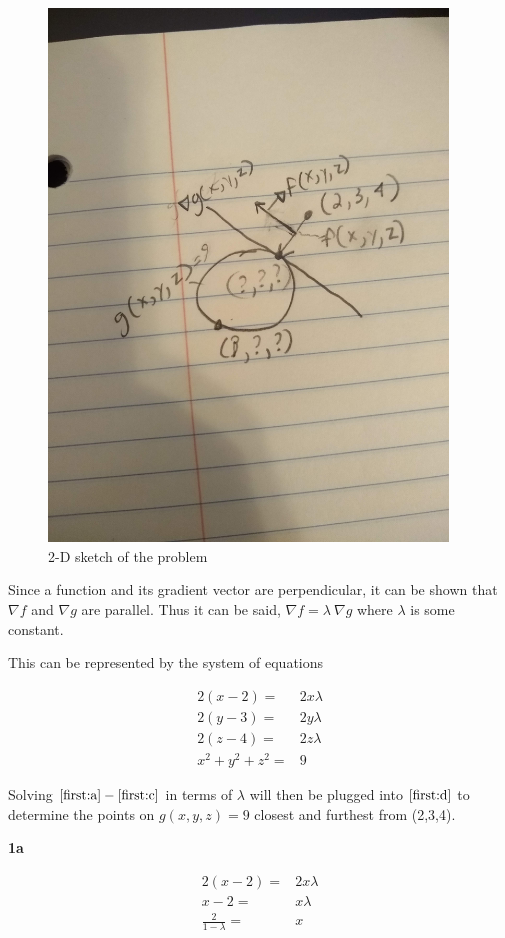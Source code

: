 \documentclass[11pt]{article}
\begin{document}
\begin{figure}[htbp]
\centering
\includegraphics[width=10.6cm,height=7cm\textwidth]{./resources/homework2.jpg}
\caption{\label{fig:org96ae625}2-D sketch of the problem}
\end{figure}


Since a function and its gradient vector are perpendicular, it can be shown that
\(\nabla f\) and \(\nabla g\) are parallel. Thus it can be said, \(\nabla f = \lambda
\ \nabla g\) where \(\lambda\) is some constant.

This can be represented by the system of equations

\begin{subequations}
\label{first:main}
\begin{align}
2(x - 2) = & 2x \lambda \label{first:a}\\
2(y - 3) = & 2y \lambda \label{first:b} \\
2(z - 4) = & 2z \lambda \label{first:c} \\
x^2 + y^2 + z^2 = & 9 \label{first:d}
\end{align}
\end{subequations}

Solving \(\eqref{first:a} - \eqref{first:c}\) in terms of \(\lambda\) will then be
plugged into \(\eqref{first:d}\) to determine the points on \(g(x,y,z) = 9\) closest
and furthest from (2,3,4).

\textbf{1a}

\begin{equation}
\begin{split}
2(x - 2) = & 2 x \lambda\\
x - 2 = & x \lambda\\
\frac{2}{1 - \lambda} = &  x
\end{split}
\end{equation}
\end{document}
